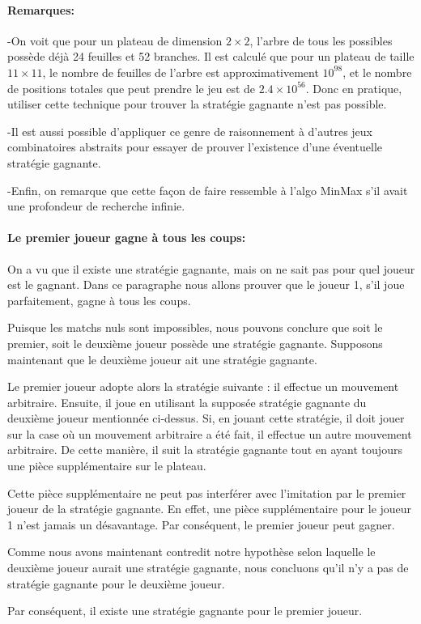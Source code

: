 \paragraph {Remarques:}
-On voit que pour un plateau de dimension $2\times2$, l'arbre de tous les possibles possède déjà 24 feuilles et 52 branches.
Il est calculé que pour un plateau de taille $11\times11$, le nombre de feuilles de l'arbre est
approximativement $10^{98}$, et le nombre de positions totales que peut prendre le jeu est de $2.4\times10^{56}$.
Donc en pratique, utiliser cette technique pour trouver la stratégie gagnante n'est pas possible.

-Il est aussi possible d'appliquer ce genre de raisonnement à d'autres jeux combinatoires abstraits pour essayer de
prouver l'existence d'une éventuelle stratégie gagnante.

-Enfin, on remarque que cette façon de faire ressemble à l'algo MinMax s'il avait une profondeur de recherche
infinie.


\paragraph {Le premier joueur gagne à tous les coups:}
On a vu que il existe une stratégie gagnante, mais on ne sait pas pour quel joueur est le gagnant. Dans ce paragraphe nous allons
prouver que le joueur 1, s'il joue parfaitement, gagne à tous les coups.

Puisque les matchs nuls sont impossibles, nous pouvons conclure que soit le premier, soit le deuxième joueur possède une stratégie
gagnante. Supposons maintenant que le deuxième joueur ait une stratégie gagnante.

Le premier joueur adopte alors la stratégie suivante : il effectue un mouvement arbitraire. Ensuite, 
il joue en utilisant la supposée stratégie gagnante du deuxième joueur mentionnée ci-dessus. Si,
en jouant cette stratégie, il doit jouer sur la case où un mouvement arbitraire a été fait, il effectue
un autre mouvement arbitraire. De cette manière, il suit la stratégie gagnante tout en ayant toujours une pièce
supplémentaire sur le plateau.

Cette pièce supplémentaire ne peut pas interférer avec l'imitation par le premier joueur de la stratégie gagnante.
En effet, une pièce supplémentaire pour le joueur 1 n'est jamais un désavantage. Par conséquent, le premier joueur peut
gagner.

Comme nous avons maintenant contredit notre hypothèse selon laquelle le deuxième joueur aurait une stratégie gagnante,
nous concluons qu'il n'y a pas de stratégie gagnante pour le deuxième joueur.

Par conséquent, il existe une stratégie gagnante pour le premier joueur.